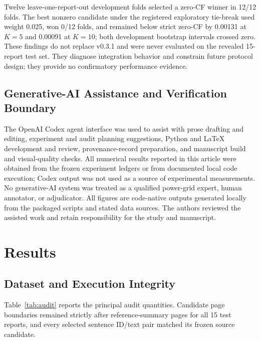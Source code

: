 \documentclass[applsci,article,submit,moreauthors]{Definitions/mdpi}
\begin{document}
Twelve leave-one-report-out development folds selected a zero-CF winner in 12/12 folds. The best nonzero candidate under the registered exploratory tie-break used weight 0.025, won 0/12 folds, and remained below strict zero-CF by 0.00131 at $K=5$ and 0.00091 at $K=10$; both development bootstrap intervals crossed zero. These findings do not replace v0.3.1 and were never evaluated on the revealed 15-report test set. They diagnose integration behavior and constrain future protocol design; they provide no confirmatory performance evidence.

\subsection{Generative-AI Assistance and Verification Boundary}

The OpenAI Codex agent interface was used to assist with prose drafting and editing, experiment and audit planning suggestions, Python and \LaTeX{} development and review, provenance-record preparation, and manuscript build and visual-quality checks. All numerical results reported in this article were obtained from the frozen experiment ledgers or from documented local code execution; Codex output was not used as a source of experimental measurements. No generative-AI system was treated as a qualified power-grid expert, human annotator, or adjudicator. All figures are code-native outputs generated locally from the packaged scripts and stated data sources. The authors reviewed the assisted work and retain responsibility for the study and manuscript.

\section{Results}

\subsection{Dataset and Execution Integrity}

Table~\ref{tab:audit} reports the principal audit quantities. Candidate page boundaries remained strictly after reference-summary pages for all 15 test reports, and every selected sentence ID/text pair matched its frozen source candidate.
\end{document}
